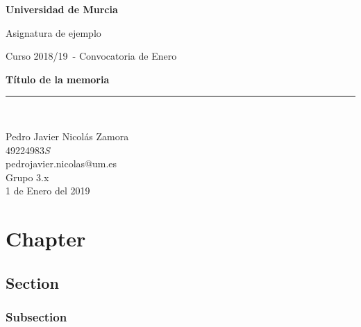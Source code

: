 \documentclass[a4paper,spanish,12pt]{report}
\title{\textitle}
\author{\texauthor}
\date{\texdate}
\makeatletter
\newcommand{\textitle}{Título de la memoria}
\newcommand{\texsubject}{Asignatura de ejemplo}
\newcommand{\texyear}{2018/19}
\newcommand{\texmonth}{Enero}
\newcommand{\texdate}{1 de Enero del 2019}
\newcommand{\texgroup}{Grupo 3.x}
\newcommand{\texauthor}{Pedro Javier Nicol\'as Zamora}
\newcommand{\texemail}{pedrojavier.nicolas@um.es}
\newcommand{\texnif}{49224983\textit{S}}
\makeatother
\begin{document}
\begin{titlepage}
\begin{center}
\begin{Huge}
\textbf{Universidad de Murcia}\\
\end{Huge}
\begin{huge}
\vspace{0.1cm}
\texsubject \\
\end{huge}
\begin{LARGE}
Curso \texyear\ - Convocatoria de \texmonth \\
\end{LARGE}
\vspace*{2cm}
\begin{Huge}
\textbf{\textitle} \\
\end{Huge}
\vspace*{\fill}
\rule{80mm}{0.1mm}\\
\vspace*{0.5cm}
\begin{Large}

\texauthor\\
\texnif\\
\texemail\\

\vspace*{0.5cm}
\texgroup \\
\texdate \\
\end{Large}
\end{center}
\end{titlepage}

\setcounter{page}{2}

\tableofcontents
\pagebreak




\chapter{Chapter}
\section{Section}
\subsection{Subsection}
\end{document}
